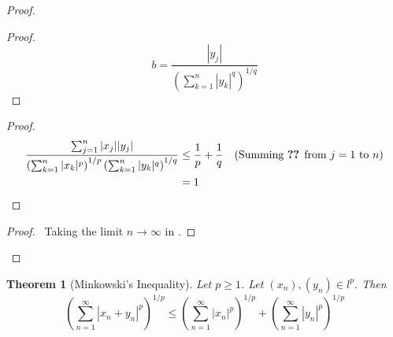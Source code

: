 \documentclass{book}
\let\qed\relax
\newtheorem{thm}[ax]{Theorem}
\theoremstyle{definition}
\begin{document}
\begin{proof}
\begin{proof}
\[	b = \frac{|y_j|}{\left( \sum_{k=1}^n |y_k|^q \right)^{1/q}} \]
\end{proof}
\begin{proof}
	\pf
	\begin{align*}
		\frac{\sum_{j=1}^n |x_j| |y_j|}{\left( \sum_{k=1}^n |x_k|^p \right)^{1/p}
\left( \sum_{k=1}^n |y_k|^q \right)^{1/q}}
& \leq \frac{1}{p} + \frac{1}{q} & (\text{Summing \stepref{4} from } j = 1 \text{ to } n) \\
& = 1
	\end{align*}
\end{proof}
\begin{proof}
	\pf\ Taking the limit $n \rightarrow \infty$ in .
\end{proof}
\qed
\end{proof}

\begin{thm}[Minkowski's Inequality]
Let $p \geq 1$. Let $(x_n), (y_n) \in l^p$. Then
\[ \left( \sum_{n=1}^\infty |x_n + y_n|^p \right)^{1/p} \leq \left( \sum_{n=1}^\infty |x_n|^p \right)^{1/p} + \left( \sum_{n=1}^\infty |y_n|^p \right)^{1/p} \]
\end{thm}
\end{document}
